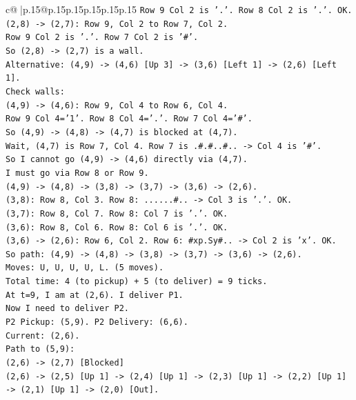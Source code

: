 \documentclass{article}
\begin{document}
{\begin{supertabular}{c@{$\;$}|p{.15\linewidth}@{}p{.15\linewidth}p{.15\linewidth}p{.15\linewidth}p{.15\linewidth}p{.15\linewidth}}
{{{\texttt{Row 9 Col 2 is '.'. Row 8 Col 2 is '.'. OK.} \\
\texttt{(2,8) {-}> (2,7): Row 9, Col 2 to Row 7, Col 2.} \\
\texttt{Row 9 Col 2 is '.'. Row 7 Col 2 is '\#'.} \\
\texttt{So (2,8) {-}> (2,7) is a wall.} \\
\texttt{Alternative: (4,9) {-}> (4,6) {[}Up 3{]} {-}> (3,6) {[}Left 1{]} {-}> (2,6) {[}Left 1{]}.} \\
\texttt{Check walls:} \\
\texttt{(4,9) {-}> (4,6): Row 9, Col 4 to Row 6, Col 4.} \\
\texttt{Row 9 Col 4='1'. Row 8 Col 4='.'. Row 7 Col 4='\#'.} \\
\texttt{So (4,9) {-}> (4,8) {-}> (4,7) is blocked at (4,7).} \\
\texttt{Wait, (4,7) is Row 7, Col 4. Row 7 is .\#.\#..\#.. {-}> Col 4 is '\#'.} \\
\texttt{So I cannot go (4,9) {-}> (4,6) directly via (4,7).} \\
\texttt{I must go via Row 8 or Row 9.} \\
\texttt{(4,9) {-}> (4,8) {-}> (3,8) {-}> (3,7) {-}> (3,6) {-}> (2,6).} \\
\texttt{(3,8): Row 8, Col 3. Row 8: ......\#.. {-}> Col 3 is '.'. OK.} \\
\texttt{(3,7): Row 8, Col 7. Row 8: Col 7 is '.'. OK.} \\
\texttt{(3,6): Row 8, Col 6. Row 8: Col 6 is '.'. OK.} \\
\texttt{(3,6) {-}> (2,6): Row 6, Col 2. Row 6: \#xp.Sy\#.. {-}> Col 2 is 'x'. OK.} \\
\texttt{So path: (4,9) {-}> (4,8) {-}> (3,8) {-}> (3,7) {-}> (3,6) {-}> (2,6).} \\
\texttt{Moves: U, U, U, U, L. (5 moves).} \\
\texttt{Total time: 4 (to pickup) + 5 (to deliver) = 9 ticks.} \\
\texttt{At t=9, I am at (2,6). I deliver P1.} \\
\texttt{Now I need to deliver P2.} \\
\texttt{P2 Pickup: (5,9). P2 Delivery: (6,6).} \\
\texttt{Current: (2,6).} \\
\texttt{Path to (5,9):} \\
\texttt{(2,6) {-}> (2,7) {[}Blocked{]}} \\
\texttt{(2,6) {-}> (2,5) {[}Up 1{]} {-}> (2,4) {[}Up 1{]} {-}> (2,3) {[}Up 1{]} {-}> (2,2) {[}Up 1{]} {-}> (2,1) {[}Up 1{]} {-}> (2,0) {[}Out{]}.} \\
}}}
\end{supertabular}}
\end{document}
